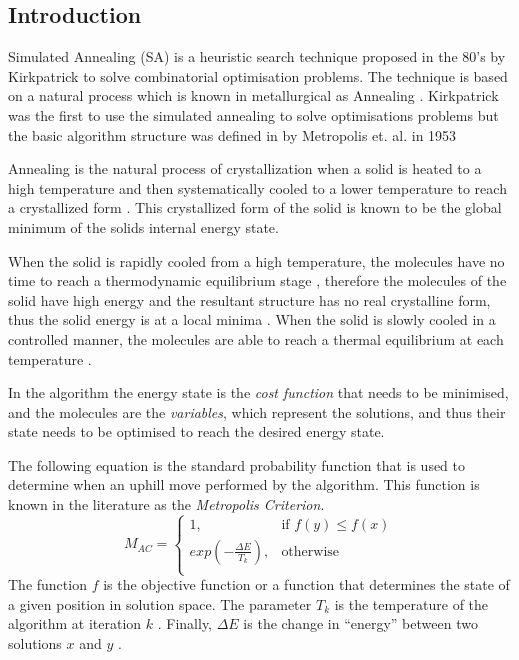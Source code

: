 \subsection{Introduction}
\label{sec:SAIntroduction}
Simulated Annealing (SA) is a heuristic search technique proposed in the 80's by Kirkpatrick to solve combinatorial optimisation problems. The technique is based on a natural process which is known in metallurgical as Annealing \cite{CurveFittingSA,SASingleMultiObj,TempCyclingSA,ChaosSA}. Kirkpatrick was the first to use the simulated annealing to solve optimisations problems but the basic algorithm structure was defined in by Metropolis et. al. in 1953 \cite{CurveFittingSA,VeryFastSAImageEnchancement}

Annealing is the natural process of crystallization when a solid is heated to a high temperature and then systematically cooled to a lower temperature to reach a crystallized form \cite{CurveFittingSA,NewSAs,MobileRobotSA,ConstantTempSA}. This crystallized form of the solid is known to be the global minimum of the solids internal energy state. 

When the solid is rapidly cooled from a high temperature, the molecules have no time to reach a thermodynamic equilibrium stage \cite{CurveFittingSA,NewSAs,MobileRobotSA,ConstantTempSA}, therefore the molecules of the solid have high energy and the resultant structure has no real crystalline form, thus the solid energy is at a local minima \cite{CurveFittingSA,NewSAs,MobileRobotSA}. When the solid is slowly cooled in a controlled manner, the molecules are able to reach a thermal equilibrium at each temperature \cite{ChaosSA,CurveFittingSA,NewSAs,MobileRobotSA,ConstantTempSA}.

In the algorithm the energy state is the \emph{cost function} that needs to be minimised, and the molecules are the \emph{variables}, which represent the solutions, and thus their state needs to be optimised to reach the desired energy state.

The following equation is the standard probability function that is used to determine when an uphill move performed by the algorithm. This function is known in the literature as the \emph{Metropolis Criterion}. 
\begin{equation}
\label{eq:saprobability}
	M_{AC} =
	\begin{cases}
	1, &\text{if $f(y) \leq f(x)$}\\
	exp(-\frac{\Delta E}{T_k}), &\text{otherwise}\\
	\end{cases}
\end{equation}
The function $f$ is the objective function or a function that determines the state of a given position in solution space\cite{EcoEquilSA}. The parameter $T_k$ is the temperature of the algorithm at iteration $k$ \cite{EcoEquilSA}. Finally, $\Delta E$ is the change in ``energy'' between two solutions $x$ and $y$ \cite{EcoEquilSA}.

